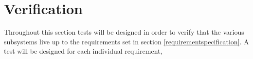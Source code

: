 
\section{Verification}
Throughout this section tests will be designed in order to verify that the various subsystems live up to the requirements set in section \ref{requirementspecification}.
A test will be designed for each individual requirement, 

